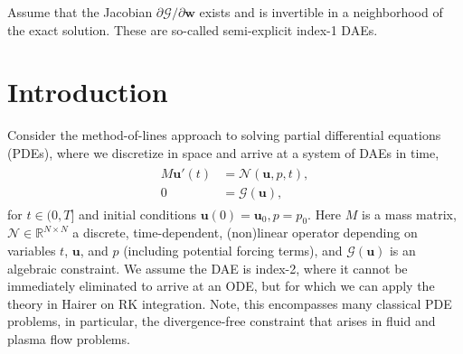 \documentclass[a4paper,10pt]{article}
\begin{document}
Assume that the Jacobian $\partial\mathcal{G}/\partial \mathbf{w}$ exists and
is invertible in a neighborhood of the exact solution. These are so-called
semi-explicit index-1 DAEs. 


\section{Introduction}

Consider the method-of-lines approach to solving partial differential equations (PDEs),
where we discretize in space and arrive at a system of DAEs in time,
%
\begin{align}\label{eq:problem}
\begin{split}
	M\mathbf{u}'(t) & =  \mathcal{N}(\mathbf{u},p,t), \\ 
	{0} & = \mathcal{G}(\mathbf{u}),
\end{split}
\end{align}
%
for $t\in(0,T]$ and initial conditions $\mathbf{u}(0) = \mathbf{u}_0, p= p_0$.
Here $M$ is a mass matrix, $\mathcal{N}\in\mathbb{R}^{N\times N}$ a discrete,
time-dependent, (non)linear operator depending on variables $t$, $\mathbf{u}$,
and $p$ (including potential forcing terms), and $\mathcal{G}(\mathbf{u})$ is
an algebraic constraint. We assume the DAE is index-2, where it cannot be
immediately eliminated to arrive at an ODE, but for which we can apply the
theory in Hairer on RK integration. Note, this encompasses many classical PDE
problems, in particular, the divergence-free constraint that arises in fluid
and plasma flow problems.
\end{document}
